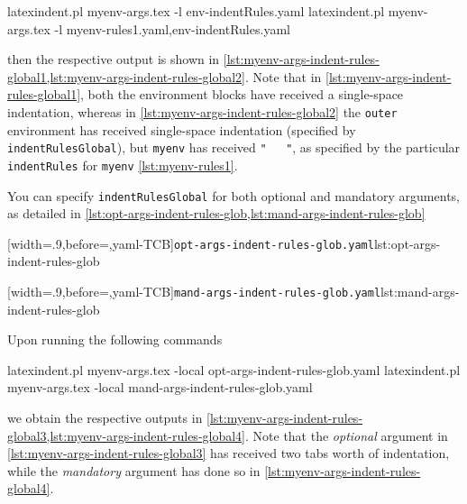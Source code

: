 \begin{commandshell}
latexindent.pl  myenv-args.tex -l env-indentRules.yaml
latexindent.pl  myenv-args.tex -l myenv-rules1.yaml,env-indentRules.yaml
\end{commandshell}
then the respective output is shown in \cref{lst:myenv-args-indent-rules-global1,lst:myenv-args-indent-rules-global2}. Note that 
in \cref{lst:myenv-args-indent-rules-global1}, both the environment blocks have received a single-space indentation, whereas in 
\cref{lst:myenv-args-indent-rules-global2} the \texttt{outer} environment has received single-space indentation (specified by \texttt{indentRulesGlobal}),
but \texttt{myenv} has received \lstinline!"   "!, as specified by the particular \texttt{indentRules} for \texttt{myenv} \vref{lst:myenv-rules1}.

\begin{minipage}{.45\textwidth}
\end{minipage}
\hfill
\begin{minipage}{.45\textwidth}
\end{minipage}

You can specify \texttt{indentRulesGlobal} for both optional and mandatory arguments, as detailed in \cref{lst:opt-args-indent-rules-glob,lst:mand-args-indent-rules-glob}

\begin{minipage}{.49\textwidth}
[width=.9\linewidth,before=\centering,yaml-TCB]{\texttt{opt-args-indent-rules-glob.yaml}}{lst:opt-args-indent-rules-glob}
\end{minipage}
\hfill
\begin{minipage}{.49\textwidth}
[width=.9\linewidth,before=\centering,yaml-TCB]{\texttt{mand-args-indent-rules-glob.yaml}}{lst:mand-args-indent-rules-glob}
\end{minipage}

Upon running the following commands
\begin{commandshell}
latexindent.pl  myenv-args.tex -local opt-args-indent-rules-glob.yaml
latexindent.pl  myenv-args.tex -local mand-args-indent-rules-glob.yaml
\end{commandshell}
we obtain the respective outputs in \cref{lst:myenv-args-indent-rules-global3,lst:myenv-args-indent-rules-global4}. Note that the \emph{optional}
argument in \cref{lst:myenv-args-indent-rules-global3} has received two tabs worth of indentation, while the \emph{mandatory} argument has
done so in \cref{lst:myenv-args-indent-rules-global4}.

